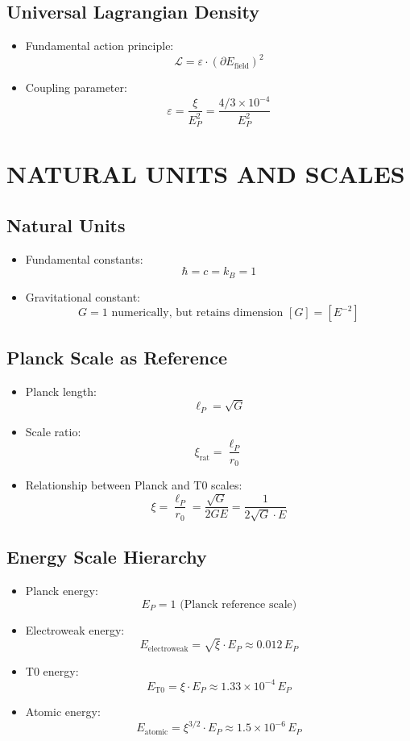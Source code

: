 \documentclass[12pt,a4paper]{article}
\begin{document}
	\subsection{Universal Lagrangian Density}
	\begin{itemize}
		\item Fundamental action principle:
		$$\boxed{\mathcal{L} = \varepsilon \cdot (\partial E_{\text{field}})^2}$$
		
		\item Coupling parameter:
		$$\varepsilon = \frac{\xi}{E_P^2} = \frac{4/3 \times 10^{-4}}{E_P^2}$$
	\end{itemize}
	
	\section{NATURAL UNITS AND SCALES}
	
	\subsection{Natural Units}
	\begin{itemize}
		\item Fundamental constants:
		$$\hbar = c = k_B = 1$$
		
		\item Gravitational constant:
		$$G = 1 \text{ numerically, but retains dimension } [G] = [E^{-2}]$$
	\end{itemize}
	
	\subsection{Planck Scale as Reference}
\begin{itemize}
	\item Planck length:
	$$\ell_P = \sqrt{G}$$
	
	\item Scale ratio:
	$$\xi_{\text{rat}} = \frac{\ell_P}{r_0}$$
	
	\item Relationship between Planck and T0 scales:
	$$\xi = \frac{\ell_P}{r_0} = \frac{\sqrt{G}}{2GE} = \frac{1}{2\sqrt{G} \cdot E}$$
\end{itemize}

	\subsection{Energy Scale Hierarchy}
	\begin{itemize}
		\item Planck energy:
		$$E_P = 1 \text{ (Planck reference scale)}$$
		
		\item Electroweak energy:
		$$E_{\text{electroweak}} = \sqrt{\xi} \cdot E_P \approx 0.012 \, E_P$$
		
		\item T0 energy:
		$$E_{\text{T0}} = \xi \cdot E_P \approx 1.33 \times 10^{-4} \, E_P$$
		
		\item Atomic energy:
		$$E_{\text{atomic}} = \xi^{3/2} \cdot E_P \approx 1.5 \times 10^{-6} \, E_P$$
	\end{itemize}
	
\end{document}
